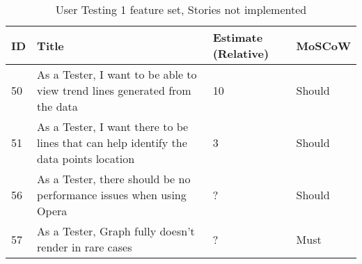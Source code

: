 \begin{table*}[hbt!]
    \begin{tabularx}{\textwidth}{ | X | X | X | X | }
        \hline
        ID & Title                                                                                 & Estimate (Relative) & MoSCoW \\
        \hline
        50 & As a Tester, I want to be able to view trend lines generated from the data            & 10                  & Should \\
        \hline
        51 & As a Tester, I want there to be lines that can help identify the data points location & 3                   & Should \\
        \hline
        56 & As a Tester, there should be no performance issues when using Opera                   & ?                   & Should \\
        \hline
        57 & As a Tester, Graph fully doesn't render in rare cases                                 & ?                   & Must   \\
        \hline
    \end{tabularx}
    \caption{User Testing 1 feature set, Stories not implemented}
    \label{UT1}
\end{table*}

